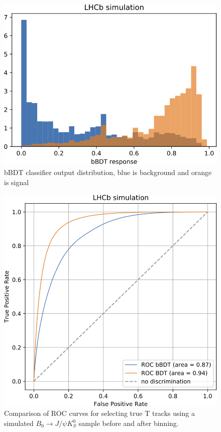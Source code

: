\begin{figure}
\centering
\hspace*{-1cm}\includegraphics[scale=0.6]{figures/bbdt_response.png}
\caption{bBDT classifier output distribution, blue is background and orange is signal }
\label{fig:bbdt response}
\end{figure}


\begin{figure}
\centering
\hspace*{-1cm}\includegraphics[scale=0.6]{figures/bBDT_roc.png}
\caption{Comparison of ROC curves for selecting true T tracks using a simulated $B_0\rightarrow J/\psi K_S^0 $ sample before and after binning.}
\label{fig:ROC binned}
\end{figure}





